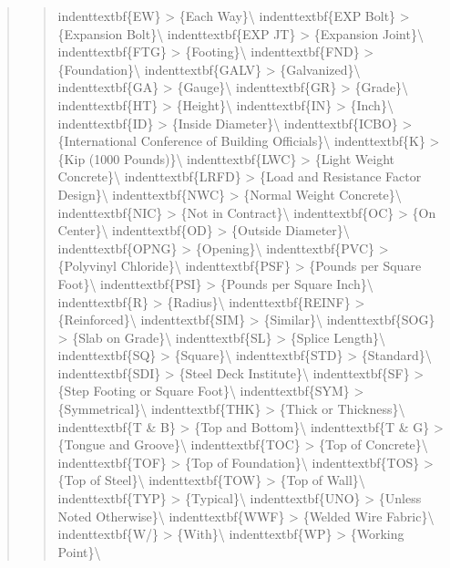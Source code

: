 \documentclass[12pt,notitle,letterpaper]{report}
\begin{document}
\begin{quote}
\begin{quote}
indenttextbf\{EW\}       >  \{Each Way\}\textbackslash{}
indenttextbf\{EXP Bolt\} >  \{Expansion Bolt\}\textbackslash{}
indenttextbf\{EXP JT\}   >  \{Expansion Joint\}\textbackslash{}
indenttextbf\{FTG\}      >  \{Footing\}\textbackslash{}
indenttextbf\{FND\}      >  \{Foundation\}\textbackslash{}
indenttextbf\{GALV\}     >  \{Galvanized\}\textbackslash{}
indenttextbf\{GA\}       >  \{Gauge\}\textbackslash{}
indenttextbf\{GR\}       >  \{Grade\}\textbackslash{}
indenttextbf\{HT\}       >  \{Height\}\textbackslash{}
indenttextbf\{IN\}       >  \{Inch\}\textbackslash{}
indenttextbf\{ID\}       >  \{Inside Diameter\}\textbackslash{}
indenttextbf\{ICBO\}     >  \{International Conference of Building Officials\}\textbackslash{}
indenttextbf\{K\}        >  \{Kip (1000 Pounds)\}\textbackslash{}
indenttextbf\{LWC\}      >  \{Light Weight Concrete\}\textbackslash{}
indenttextbf\{LRFD\}     >  \{Load and Resistance Factor Design\}\textbackslash{}
indenttextbf\{NWC\}      >  \{Normal Weight Concrete\}\textbackslash{}
indenttextbf\{NIC\}      >  \{Not in Contract\}\textbackslash{}
indenttextbf\{OC\}       >  \{On Center\}\textbackslash{}
indenttextbf\{OD\}       >  \{Outside Diameter\}\textbackslash{}
indenttextbf\{OPNG\}     >  \{Opening\}\textbackslash{}
indenttextbf\{PVC\}      >  \{Polyvinyl Chloride\}\textbackslash{}
indenttextbf\{PSF\}      >  \{Pounds per Square Foot\}\textbackslash{}
indenttextbf\{PSI\}      >  \{Pounds per Square Inch\}\textbackslash{}
indenttextbf\{R\}        >  \{Radius\}\textbackslash{}
indenttextbf\{REINF\}    >  \{Reinforced\}\textbackslash{}
indenttextbf\{SIM\}      >  \{Similar\}\textbackslash{}
indenttextbf\{SOG\}      >  \{Slab on Grade\}\textbackslash{}
indenttextbf\{SL\}       >  \{Splice Length\}\textbackslash{}
indenttextbf\{SQ\}       >  \{Square\}\textbackslash{}
indenttextbf\{STD\}      >  \{Standard\}\textbackslash{}
indenttextbf\{SDI\}      >  \{Steel Deck Institute\}\textbackslash{}
indenttextbf\{SF\}       >  \{Step Footing or Square Foot\}\textbackslash{}
indenttextbf\{SYM\}      >  \{Symmetrical\}\textbackslash{}
indenttextbf\{THK\}      >  \{Thick or Thickness\}\textbackslash{}
indenttextbf\{T \& B\}   >  \{Top and Bottom\}\textbackslash{}
indenttextbf\{T \& G\}   >  \{Tongue and Groove\}\textbackslash{}
indenttextbf\{TOC\}      >  \{Top of Concrete\}\textbackslash{}
indenttextbf\{TOF\}      >  \{Top of Foundation\}\textbackslash{}
indenttextbf\{TOS\}      >  \{Top of Steel\}\textbackslash{}
indenttextbf\{TOW\}      >  \{Top of Wall\}\textbackslash{}
indenttextbf\{TYP\}      >  \{Typical\}\textbackslash{}
indenttextbf\{UNO\}      >  \{Unless Noted Otherwise\}\textbackslash{}
indenttextbf\{WWF\}      >  \{Welded Wire Fabric\}\textbackslash{}
indenttextbf\{W/\}       >  \{With\}\textbackslash{}
indenttextbf\{WP\}       >  \{Working Point\}\textbackslash{}
\end{quote}


\end{quote}
\end{document}
